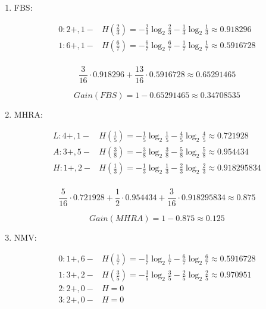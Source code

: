 \begin{enumerate}
\begin{enumerate}
\begin{enumerate}
					\item{FBS:}

						\[
							\begin{array}{l|l}
								0: 2+, 1- & H(\frac{2}{3}) = - \frac{2}{3} \log_2 \frac{2}{3} - \frac{1}{3} \log_2 \frac{1}{3} \approx 0.918296 \\
								1: 6+, 1- & H(\frac{6}{7}) = - \frac{6}{7} \log_2 \frac{6}{7} - \frac{1}{7} \log_2 \frac{1}{7} \approx 0.5916728 \\
							\end{array}
						\] 
						
						\[
							\frac{3}{16} \cdot 0.918296 + \frac{13}{16} \cdot 0.5916728 \approx 0.65291465
						\]
						
						\[
							Gain(FBS) = 1 - 0.65291465 \approx 0.34708535
						\]

					\item{MHRA:}

						\[
							\begin{array}{l|l}
								L: 4+, 1- & H(\frac{1}{5}) = - \frac{1}{5} \log_2 \frac{1}{5} - \frac{4}{5} \log_2 \frac{4}{5} \approx 0.721928 \\
								A: 3+, 5- & H(\frac{3}{8}) = - \frac{3}{8} \log_2 \frac{3}{8} - \frac{5}{8} \log_2 \frac{5}{8} \approx 0.954434 \\
								H: 1+, 2- & H(\frac{1}{3}) = - \frac{1}{3} \log_2 \frac{1}{3} - \frac{2}{3} \log_2 \frac{2}{3} \approx 0.918295834 \\
							\end{array}
						\] 
						
						\[
							\frac{5}{16} \cdot 0.721928 + \frac{1}{2} \cdot 0.954434 + \frac{3}{16} \cdot 0.918295834 \approx 0.875
						\]
						
						\[
							Gain(MHRA) = 1 - 0.875 \approx 0.125
						\]

					\item{NMV:}
					

						\[
							\begin{array}{l|l}
								0: 1+, 6- & H(\frac{1}{7}) = - \frac{1}{7} \log_2 \frac{1}{7} - \frac{6}{7} \log_2 \frac{6}{7} \approx 0.5916728 \\
								1: 3+, 2- & H(\frac{3}{5}) = - \frac{3}{5} \log_2 \frac{3}{5} - \frac{2}{5} \log_2 \frac{2}{5} \approx 0.970951 \\
								2: 2+, 0- & H = 0 \\
								3: 2+, 0- & H = 0 \\
							\end{array}
						\] 
						

\end{enumerate}
\end{enumerate}
\end{enumerate}

